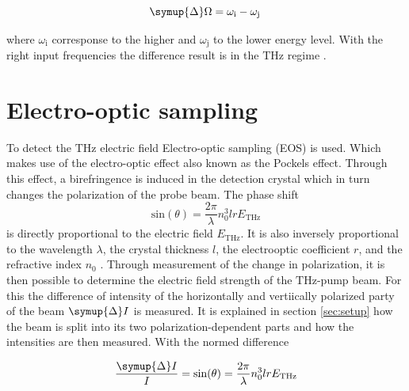 \begin{equation}
    \symup{\Delta}\Omega = \omega_\text{i} - \omega_\text{j} \,
\end{equation}

where $\omega_\text{i}$ corresponse to the higher and $\omega_\text{j}$ to the lower energy level.
With the right input frequencies the difference result is in the $\si{\tera\hertz}$ regime \cite{boyd2020nonlinear}.



\section{Electro-optic sampling}\label{sec:eos}
To detect the $\si{\tera\hertz}$ electric field Electro-optic sampling (EOS) is used.
Which makes use of the electro-optic effect also known as the Pockels effect.
Through this effect, a birefringence is induced in the detection crystal which in turn changes the polarization of the probe beam.
The phase shift 
\begin{equation}
    \text{sin}(\theta) = \frac{2\pi}{\lambda} n_0^3 l r E_\text{THz}
\end{equation}
is directly proportional to the electric field $E_\text{THz}$. 
It is also inversely proportional to the wavelength $\lambda$, the crystal thickness $l$, the electrooptic coefficient $r$, and the refractive index $n_0$ \cite{wiki_book}. 
Through measurement of the change in polarization, it is then possible to determine the electric field strength of the $\si{\tera\hertz}$-pump beam.
For this the difference of intensity of the horizontally and vertiically polarized party of the beam $\symup{\Delta}I$ is measured.
It is explained in section \ref{sec:setup} how the beam is split into its two polarization-dependent parts and how the intensities are then measured.
With the normed difference 

\begin{equation}
    \frac{\symup{\Delta}I}{I} = \text{sin}(\theta) = \frac{2\pi}{\lambda} n_0^3 l r E_\text{THz}
    \label{eq:electricfield_A_B}
\end{equation}

